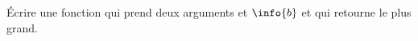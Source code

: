 
\begin{exercice}\label{exosmath-0037}

    Écrire une fonction qui prend deux arguments  et \( \info{b}\) et qui retourne le plus grand.

\end{exercice}
